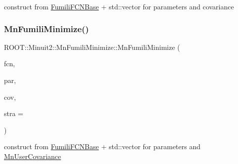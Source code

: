 construct from \mbox{\hyperlink{classROOT_1_1Minuit2_1_1FumiliFCNBase}{Fumili\+F\+C\+N\+Base}} + std\+::vector for parameters and covariance 

\mbox{\label{classROOT_1_1Minuit2_1_1MnFumiliMinimize_a48eae3f1c5b8eef3b6940d3fd5d26af8}} 
\subsubsection{\texorpdfstring{MnFumiliMinimize()}{MnFumiliMinimize()}\hspace{0.1cm}{\footnotesize\ttfamily [10/21]}}
{\footnotesize\ttfamily R\+O\+O\+T\+::\+Minuit2\+::\+Mn\+Fumili\+Minimize\+::\+Mn\+Fumili\+Minimize (\begin{DoxyParamCaption}\item[{const \mbox{\hyperlink{classROOT_1_1Minuit2_1_1FumiliFCNBase}{Fumili\+F\+C\+N\+Base}} \&}]{fcn,  }\item[{const std\+::vector$<$ double $>$ \&}]{par,  }\item[{const \mbox{\hyperlink{classROOT_1_1Minuit2_1_1MnUserCovariance}{Mn\+User\+Covariance}} \&}]{cov,  }\item[{unsigned int}]{stra = {} }\end{DoxyParamCaption})\hspace{0.3cm}{\ttfamily [inline]}}



construct from \mbox{\hyperlink{classROOT_1_1Minuit2_1_1FumiliFCNBase}{Fumili\+F\+C\+N\+Base}} + std\+::vector for parameters and \mbox{\hyperlink{classROOT_1_1Minuit2_1_1MnUserCovariance}{Mn\+User\+Covariance}} 

\mbox{\label{classROOT_1_1Minuit2_1_1MnFumiliMinimize_aec4f0adff373393b4023f3a783b7d4bd}} 
